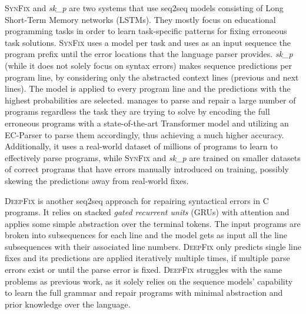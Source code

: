 %
\textsc{SynFix} \citep{Bhatia2016} and \emph{sk\_p} \citep{Pu2016} are two
systems that use seq2seq models consisting of Long Short-Term Memory networks
(LSTMs). They mostly focus on educational programming tasks in order to learn
task-specific patterns for fixing erroneous task solutions. \textsc{SynFix} uses
a model per task and uses as an input sequence the program prefix until the
error locations that the language parser provides. \emph{sk\_p} (while it does
not solely focus on syntax errors) makes sequence predictions per program line,
by considering only the abstracted context lines (previous and next lines). The
model is applied to every program line and the predictions with the highest
probabilities are selected. \toolname manages to parse and repair a large number
of programs regardless the task they are trying to solve by encoding the full
erroneous programs with a state-of-the-art Transformer model and utilizing an
EC-Parser to parse them accordingly, thus achieving a much higher accuracy.
Additionally, it uses a real-world dataset of millions of \python programs to
learn to effectively parse programs, while \textsc{SynFix} and \emph{sk\_p} are
trained on smaller datasets of correct programs that have errors manually
introduced on training, possibly skewing the predictions away from real-world
fixes.

\textsc{DeepFix} \citep{Gupta2017} is another seq2seq approach for repairing
syntactical errors in \textsc{C} programs. It relies on stacked \emph{gated
recurrent units} (GRUs) with attention and applies some simple abstraction over
the terminal tokens. The input programs are broken into subsequences for each
line and the model gets as input all the line subsequences with their associated
line numbers. \textsc{DeepFix} only predicts single line fixes and its predictions
are applied iteratively multiple times, if multiple parse errors exist or until
the parse error is fixed. \textsc{DeepFix} struggles with the same problems as
previous work, as it solely relies on the sequence models' capability to learn
the full grammar and repair programs with minimal abstraction and prior
knowledge over the language.

